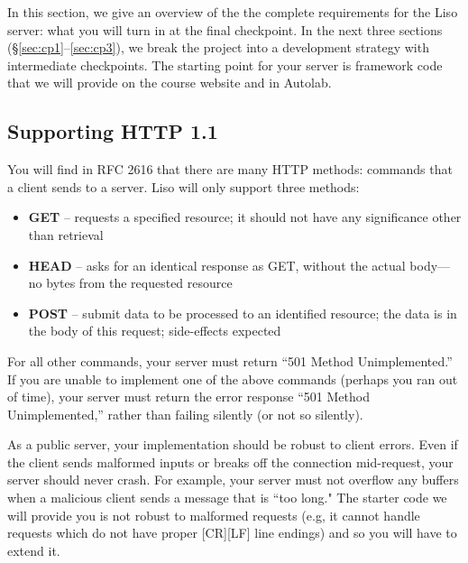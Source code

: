 \label{sec:liso}

In this section, we give an overview of the the complete requirements for the Liso server: what you will turn in at the final checkpoint. 
In the next three sections (\S\ref{sec:cp1}--\ref{sec:cp3}), we break the project into a development strategy with intermediate 
checkpoints.  The starting point for your server is framework code that we will provide on the course website and in Autolab. 


\subsection{Supporting HTTP 1.1}
You will find in RFC 2616 that there are many HTTP methods: commands that a client sends to a server.
Liso will only support three methods:

\begin{itemize}
\item \textbf{GET} -- requests a specified resource; it should not have any
                       significance other than retrieval
\item \textbf{HEAD} -- asks for an identical response as GET, without the actual
                       body---no bytes from the requested resource
\item \textbf{POST} -- submit data to be processed to an identified resource;
                       the data is in the body of this request; side-effects
                       expected
\end{itemize}

For all other commands, your server must return ``501 Method Unimplemented.'' 
If
you are unable to implement one of the above commands (perhaps you ran out of
time), your server must return the error response ``501 Method Unimplemented,''
rather than failing silently (or not so silently).  

\vspace{5pt}

 As a public server, your implementation should be
robust to client errors. 
Even if the client sends malformed inputs or breaks off the connection mid-request, your server should never crash.
For example, your server must not
overflow any buffers when a malicious client sends a message that is ``too long." 
The starter code we will provide you is not robust to malformed requests (e.g, it cannot handle requests which do not have proper [CR][LF] line endings) and so you will have to extend it.

